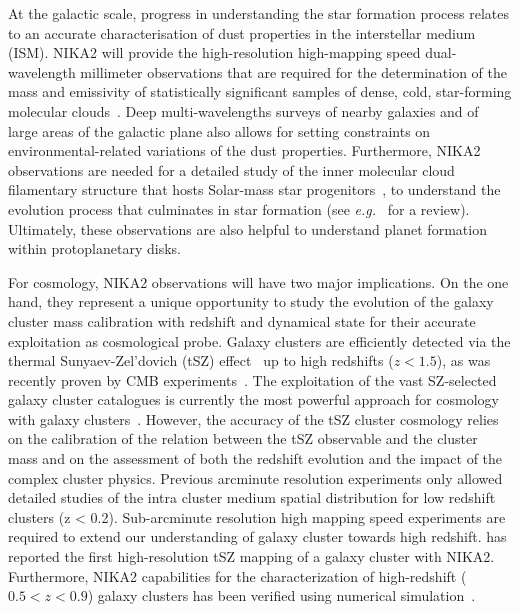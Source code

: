 At the galactic scale, progress in understanding the star formation
process relates to an accurate characterisation of dust properties in
the interstellar medium (ISM). NIKA2 will provide the high-resolution
high-mapping speed dual-wavelength millimeter observations that are
required for the determination of the mass and emissivity of
statistically significant samples of dense, cold, star-forming
molecular clouds~\citep{Rigby2018}.
Deep multi-wavelengths surveys of nearby galaxies and of large areas
of the galactic plane also allows for setting constraints on
environmental-related variations of the dust properties.
Furthermore, NIKA2 observations are needed for a
detailed study of the inner molecular cloud filamentary structure that
hosts Solar-mass star progenitors~\citep{Bracco2017}, to
understand the evolution process that culminates in star
formation (see \emph{e.g.}~\citet{Andre2014} for a review). Ultimately, these
observations are also helpful to understand planet formation within
protoplanetary disks.

For cosmology, NIKA2 observations will have two major
implications. On the one hand, they represent a unique opportunity to
study the evolution of the galaxy cluster mass calibration with
redshift and {\lp dynamical state} for their accurate exploitation as cosmological probe. 
Galaxy clusters are efficiently detected via the thermal
Sunyaev-Zel'dovich (tSZ) effect~\citep{SZ1970} up to high redshifts {\lp ($z<1.5$)}, as was recently
proven by CMB
experiments~\citep{Hasselfield2013_ACT_SZ, Reichardt2013_SPT_SZ, Planck2016_SZcat}.
The exploitation of the vast SZ-selected galaxy cluster catalogues is
currently the most powerful approach for cosmology with galaxy
clusters~\citep{Planck_2016_SZ_cosmo}. However, the accuracy of the tSZ cluster
cosmology relies on the calibration of the relation between the tSZ
observable and the cluster mass and on the assessment of both the redshift
evolution and the impact of the complex cluster physics. 
Previous arcminute resolution experiments only allowed detailed studies
of the intra cluster medium spatial distribution for low redshift clusters (z <
0.2). Sub-arcminute resolution high mapping speed experiments are
required to extend our understanding of galaxy cluster towards high
redshift. \citet{Ruppin2018} has reported the first high-resolution
tSZ mapping of a galaxy cluster with NIKA2. Furthermore, NIKA2
capabilities for the characterization of high-redshift {\lp ($0.5<z<0.9$)} galaxy clusters
has been verified using numerical simulation~\citep{Ruppin2019}.

